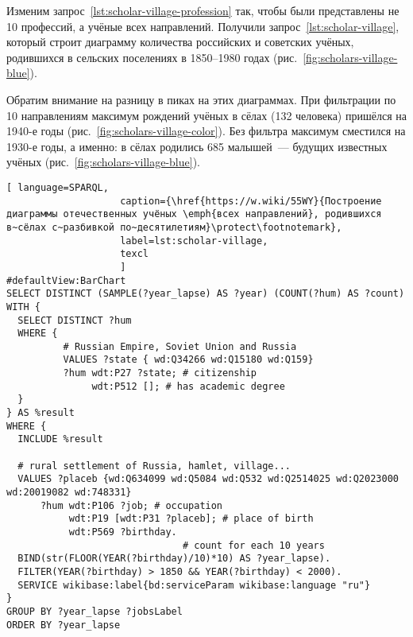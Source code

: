 \newpage
Изменим запрос~\ref{lst:scholar-village-profession} так, 
чтобы были представлены не 10 профессий, а учёные всех направлений. 
Получили запрос~\ref{lst:scholar-village}, 
который строит диаграмму количества российских и советских учёных, 
родившихся в сельских поселениях в 1850--1980 годах (рис.~\ref{fig:scholars-village-blue}). 

Обратим внимание на разницу в пиках на этих диаграммах. 
При фильтрации по 10 направлениям максимум рождений учёных в сёлах (132 человека) 
пришёлся на 1940-е годы (рис.~\ref{fig:scholars-village-color}). 
Без фильтра максимум сместился на 1930-е годы, а именно: 
в сёлах родились 685 малышей~--- будущих известных учёных (рис.~\ref{fig:scholars-village-blue}). 



\begin{lstlisting}[ language=SPARQL, 
                    caption={\href{https://w.wiki/55WY}{Построение диаграммы отечественных учёных \emph{всех направлений}, родившихся в~сёлах с~разбивкой по~десятилетиям}\protect\footnotemark},
                    label=lst:scholar-village,
                    texcl 
                    ]
#defaultView:BarChart
SELECT DISTINCT (SAMPLE(?year_lapse) AS ?year) (COUNT(?hum) AS ?count) 
WITH {
  SELECT DISTINCT ?hum 
  WHERE {
          # Russian Empire, Soviet Union and Russia
          VALUES ?state { wd:Q34266 wd:Q15180 wd:Q159}
          ?hum wdt:P27 ?state; # citizenship
               wdt:P512 []; # has academic degree 
  }
} AS %result
WHERE {
  INCLUDE %result

  # rural settlement of Russia, hamlet, village...
  VALUES ?placeb {wd:Q634099 wd:Q5084 wd:Q532 wd:Q2514025 wd:Q2023000 wd:20019082 wd:748331}
      ?hum wdt:P106 ?job; # occupation
           wdt:P19 [wdt:P31 ?placeb]; # place of birth
           wdt:P569 ?birthday.
                               # count for each 10 years
  BIND(str(FLOOR(YEAR(?birthday)/10)*10) AS ?year_lapse). 
  FILTER(YEAR(?birthday) > 1850 && YEAR(?birthday) < 2000).
  SERVICE wikibase:label{bd:serviceParam wikibase:language "ru"}
}
GROUP BY ?year_lapse ?jobsLabel
ORDER BY ?year_lapse
\end{lstlisting}%


